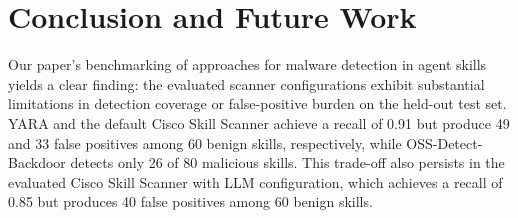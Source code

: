 \section{Conclusion and Future Work}
\label{sec:conclusion-future-work}







Our paper's benchmarking of approaches for malware
detection in agent skills yields a clear finding:
the evaluated scanner configurations exhibit substantial
limitations in detection coverage or false-positive burden
on the held-out test set. YARA and the default Cisco
Skill Scanner achieve a recall of 0.91 but produce
49 and 33 false positives among 60 benign skills,
respectively, while OSS-Detect-Backdoor detects only
26 of 80 malicious skills. This trade-off also persists
in the evaluated Cisco Skill Scanner with LLM
configuration, which achieves a recall of 0.85 but
produces 40 false positives among 60 benign skills.

